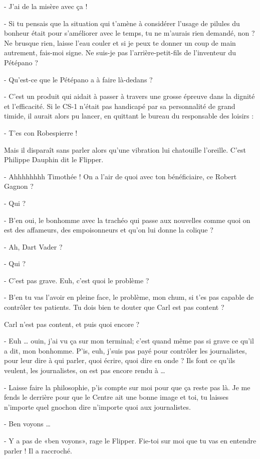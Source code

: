 - J’ai de la misère avec ça !

- Si tu pensais que la situation qui t’amène à considérer l’usage de pilules du bonheur était pour s’améliorer avec le temps, tu ne m’aurais rien demandé, non ? Ne brusque rien, laisse l’eau couler et si je peux te donner un coup de main autrement, fais-moi signe. Ne suis-je pas l’arrière-petit-fils de l’inventeur du Pétépano ?

- Qu’est-ce que le Pétépano a à faire là-dedans ?

- C’est un produit qui aidait à passer à travers une grosse épreuve dans la dignité et l’efficacité.
Si le CS-1 n’était pas handicapé par sa personnalité de grand timide, il aurait alors pu lancer, en quittant le bureau du responsable des loisirs :

- T’es con Robespierre !

Mais il disparaît sans parler alors qu’une vibration lui chatouille l’oreille. C’est Philippe Dauphin dit le Flipper.

- Ahhhhhhhh Timothée ! On a l’air de quoi avec ton bénéficiaire, ce Robert Gagnon ?

- Qui ?

- B’en oui, le bonhomme avec la trachéo qui passe aux nouvelles comme quoi on est des affameurs, des empoisonneurs et qu’on lui donne la colique ?

- Ah, Dart Vader ?

- Qui ?

- C’est pas grave. Euh, c’est quoi le problème ?

- B’en tu vas l’avoir en pleine face, le problème, mon chum, si t’es pas capable de contrôler tes patients. Tu dois bien te douter que Carl est pas content ?

Carl n’est pas content, et puis quoi encore ?

- Euh … ouin, j’ai vu ça sur mon terminal; c’est quand même pas si grave ce qu’il a dit, mon bonhomme. P’is, euh, j’suis pas payé pour contrôler les journalistes, pour leur dire à qui parler, quoi écrire, quoi dire en onde ? Ils font ce qu’ils veulent, les journalistes, on est pas encore rendu à …

- Laisse faire la philosophie, p’is compte sur moi pour que ça reste pas là. Je me fends le derrière pour que le Centre ait une bonne image et toi, tu laisses n’importe quel gnochon dire n’importe quoi aux journalistes.

- Ben voyons …

- Y a pas de «ben voyons», rage le Flipper. Fie-toi sur moi que tu vas en entendre parler !
Il a raccroché.

